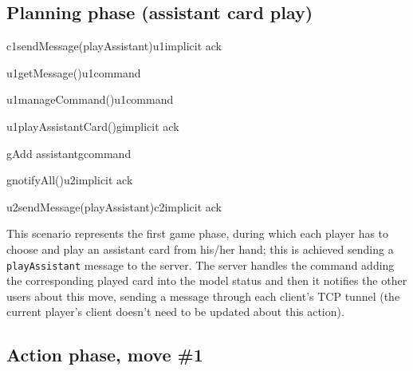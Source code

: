 \documentclass[a4paper]{article}
\begin{document}
	\pagebreak

	\subsection{Planning phase (assistant card play)}

	\begin{center}
		\begin{sequencediagram}

			\begin{call}{c1}{sendMessage(playAssistant)}{u1}{implicit ack}
				\begin{call}{u1}{getMessage()}{u1}{command}
				\end{call}
				\begin{call}{u1}{manageCommand()}{u1}{command}
				\end{call}
				\begin{call}{u1}{playAssistantCard()}{g}{implicit ack}
					\begin{call}{g}{Add assistant}{g}{command}
					\end{call}
					\begin{call}{g}{notifyAll()}{u2}{implicit ack}
						\begin{call}{u2}{sendMessage(playAssistant)}{c2}{implicit ack}
						\end{call}
					\end{call}
				\end{call}
			\end{call}
		\end{sequencediagram}
	\end{center}

	This scenario represents the first game phase, during which each player has to choose and play an assistant card from his/her hand; this is achieved sending a \verb|playAssistant| message to the server. The server handles the command adding the corresponding played card into the model status and then it notifies the other users about this move, sending a message through each client's TCP tunnel (the current player's client doesn't need to be updated about this action).

	\pagebreak

	\subsection{Action phase, move \#1}
\end{document}
